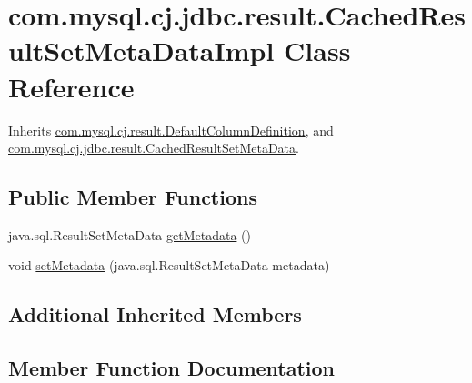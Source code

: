 \hypertarget{classcom_1_1mysql_1_1cj_1_1jdbc_1_1result_1_1_cached_result_set_meta_data_impl}{}\section{com.\+mysql.\+cj.\+jdbc.\+result.\+Cached\+Result\+Set\+Meta\+Data\+Impl Class Reference}
\label{classcom_1_1mysql_1_1cj_1_1jdbc_1_1result_1_1_cached_result_set_meta_data_impl}


Inherits \mbox{\hyperlink{classcom_1_1mysql_1_1cj_1_1result_1_1_default_column_definition}{com.\+mysql.\+cj.\+result.\+Default\+Column\+Definition}}, and \mbox{\hyperlink{interfacecom_1_1mysql_1_1cj_1_1jdbc_1_1result_1_1_cached_result_set_meta_data}{com.\+mysql.\+cj.\+jdbc.\+result.\+Cached\+Result\+Set\+Meta\+Data}}.

\subsection*{Public Member Functions}
\begin{DoxyCompactItemize}
\item 
java.\+sql.\+Result\+Set\+Meta\+Data \mbox{\hyperlink{classcom_1_1mysql_1_1cj_1_1jdbc_1_1result_1_1_cached_result_set_meta_data_impl_ad340a766600a4dd265fcd87df0e85b78}{get\+Metadata}} ()
\item 
void \mbox{\hyperlink{classcom_1_1mysql_1_1cj_1_1jdbc_1_1result_1_1_cached_result_set_meta_data_impl_ae5fdc22b3e94b8fd950721c1c8fea867}{set\+Metadata}} (java.\+sql.\+Result\+Set\+Meta\+Data metadata)
\end{DoxyCompactItemize}
\subsection*{Additional Inherited Members}


\subsection{Member Function Documentation}
\mbox{\label{classcom_1_1mysql_1_1cj_1_1jdbc_1_1result_1_1_cached_result_set_meta_data_impl_ad340a766600a4dd265fcd87df0e85b78}} 
